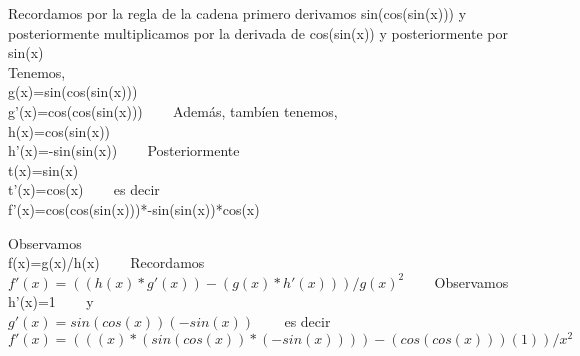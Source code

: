\documentclass[12pt]{article}
\begin{document}


        Recordamos por la regla de la cadena primero derivamos sin(cos(sin(x))) y posteriormente multiplicamos por la derivada de cos(sin(x)) y posteriormente por sin(x) \\
        Tenemos,\\
        g(x)=sin(cos(sin(x)))\\
        g'(x)=cos(cos(sin(x))) \ \ \ %
        Además, tambíen tenemos,\\
        h(x)=cos(sin(x))\\
        h'(x)=-sin(sin(x)) \ \ \ %
        Posteriormente\\
        t(x)=sin(x)\\
        t'(x)=cos(x) \ \ \ %
        es decir\\
        f'(x)=cos(cos(sin(x)))*-sin(sin(x))*cos(x) \ \ \ %


        Observamos\\
        f(x)=g(x)/h(x)  \ \ \ %
        Recordamos\\
        $f'(x)=((h(x)*g'(x))-(g(x)*h'(x)))/g(x)^2$ \ \ \ %
        Observamos\\
        h'(x)=1 \ \ \ %
        y\\
        $g'(x)=sin(cos(x))(-sin(x))$ \ \ \ %
        es decir\\
        $f'(x)= (((x)*(sin(cos(x))*(-sin(x))))-(cos(cos(x)))(1))/x^2$ \ \ \ %
\end{document}
